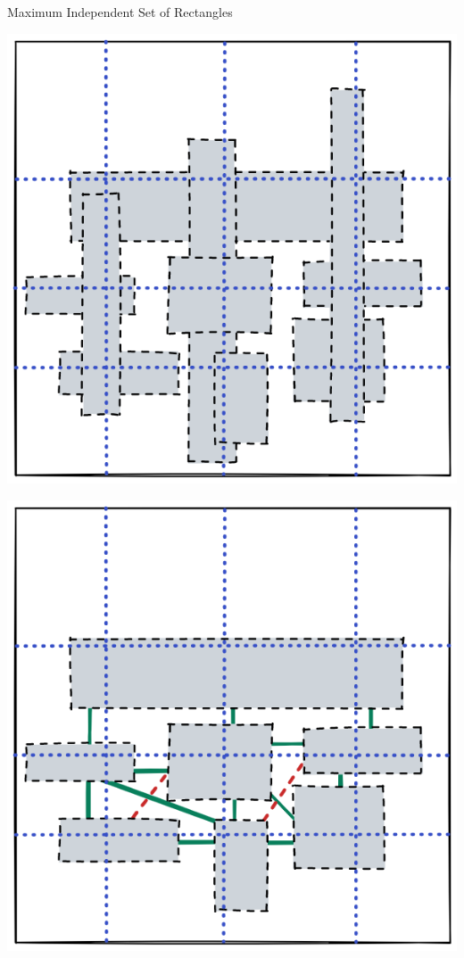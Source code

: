\documentclass[handout,usenames,dvipsnames]{beamer}
\begin{document}
\begin{frame}{Maximum Independent Set of Rectangles}
    \begin{minipage}{0.45\textwidth}
    \includegraphics[width=\textwidth]{g11.png}
    \end{minipage}\hfill
    \begin{minipage}{0.45\textwidth}
    \includegraphics[width=\textwidth]{g12.png}
    \end{minipage}
\end{frame}
\end{document}
